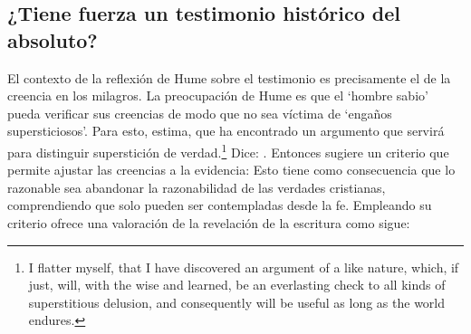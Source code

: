 \subsection{¿Tiene fuerza un testimonio histórico del absoluto?}
El contexto de la reflexión de Hume sobre el testimonio es precisamente el de la
creencia en los milagros. La preocupación de Hume es que el `hombre sabio' pueda
verificar sus creencias de modo que no sea víctima de `engaños supersticiosos'.
Para esto, estima, que ha encontrado un argumento que servirá para distinguir
superstición de verdad.\footnote{I flatter myself, that I have discovered an
  argument of a like nature, which, if just, will, with the wise and learned, be
  an everlasting check to all kinds of superstitious delusion, and consequently
  will be useful as long as the world endures.} Dice: . Entonces
sugiere un criterio que permite ajustar las creencias a la evidencia:
Esto tiene como consecuencia que lo razonable sea abandonar la razonabilidad de
las verdades cristianas, comprendiendo que solo pueden ser contempladas desde la
fe. Empleando su criterio ofrece una valoración de la revelación de la escritura
como sigue:
